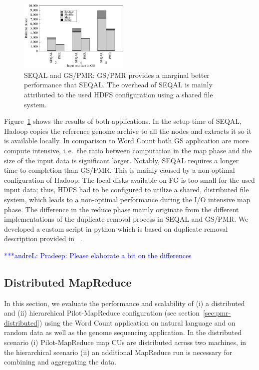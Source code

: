 \documentclass{acm_proc_article-sp}
\newcommand{\alnote}[1]{ {\textcolor{blue} { ***andreL: #1 }}}
\newcommand{\alnote}[1]{}
\newcommand{\pilotmapreduce}{Pilot-MapReduce\xspace}
\begin{document}

\begin{figure}[ht]
	\centering
		\includegraphics[width=0.47\textwidth]{figures/gs_seq_pmr.pdf}
\caption{SEQAL and GS/PMR: GS/PMR provides a marginal better performance that 
SEQAL. The overhead of SEQAL is mainly attributed to the used HDFS configuration 
using a shared file system.} 	
\label{fig:gs_seq_pmr}
\end{figure}		

Figure~\ref{fig:gs_seq_pmr} shows the results of both applications. In the
setup time of SEQAL, Hadoop copies the reference genome archive to all the 
nodes and extracts it so it is available locally.
In comparison to Word Count both GS application are more compute intensive,
i.\,e.\ the ratio between computation in the map phase and the size of the input
data is significant larger. Notably, SEQAL requires a longer time-to-completion
than GS/PMR. This is mainly caused by a non-optimal configuration of Hadoop: The
local disks available on FG is too small for the used input data; thus, HDFS had
to be configured to utilize a shared, distributed file system, which leads to a
non-optimal performance during the I/O intensive map phase. The difference in
the reduce phase mainly originate from the different implementations of the
duplicate removal process in SEQAL and GS/PMR. We developed a custom script in python
which is based on duplicate removal description provided in ~\cite{seal-2011}.

\alnote{Pradeep: Please elaborate a bit on the differences}

\subsection{Distributed MapReduce}

In this section, we evaluate the performance and scalability of (i) a 
distributed and (ii) hierarchical \pilotmapreduce configuration (see
section~\ref{sec:pmr-distributed}) using the Word Count application on natural 
language and on random data as well as the genome sequencing application. In the 
distributed scenario (i) \pilotmapreduce map CUs are distributed across 
two machines, in the  hierarchical scenario (ii) an additional MapReduce run is 
necessary for combining and aggregating the data.
\end{document}
